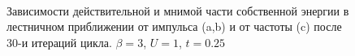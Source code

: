 \documentclass[11pt,a4paper]{report}
\begin{document}
\begin{figure}[H]
\centering
{}
\\
\caption{Зависимости действительной и мнимой части собственной энергии в лестничном приближении от импульса (a,b) и от частоты (c) после 30-и итераций цикла. $\beta=3$, $U=1$, $t=0.25$}
\label{SigmaLDFA}
\end{figure}
\end{document}
